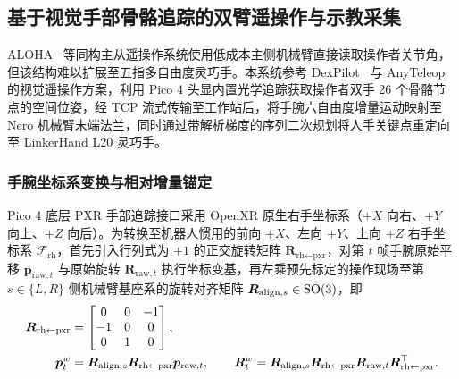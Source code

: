 \subsection{基于视觉手部骨骼追踪的双臂遥操作与示教采集}
\label{subsec:teleop}

ALOHA~\cite{zhao2023learning} 等同构主从遥操作系统使用低成本主侧机械臂直接读取操作者关节角，但该结构难以扩展至五指多自由度灵巧手。本系统参考 DexPilot~\cite{handa2020dexpilot} 与 AnyTeleop~\cite{qin2023anyteleop} 的视觉遥操作方案，利用 Pico 4 头显内置光学追踪获取操作者双手 26 个骨骼节点的空间位姿，经 TCP 流式传输至工作站后，将手腕六自由度增量运动映射至 Nero 机械臂末端法兰，同时通过带解析梯度的序列二次规划将人手关键点重定向至 LinkerHand L20 灵巧手。

\subsubsection{手腕坐标系变换与相对增量锚定}

Pico 4 底层 PXR 手部追踪接口采用 OpenXR 原生右手坐标系（$+X$ 向右、$+Y$ 向上、$+Z$ 向后）。为转换至机器人惯用的前向 $+X$、左向 $+Y$、上向 $+Z$ 右手坐标系 $\mathcal{F}_{\text{rh}}$，首先引入行列式为 $+1$ 的正交旋转矩阵 $\bm{R}_{\text{rh}\leftarrow\text{pxr}}$，对第 $t$ 帧手腕原始平移 $\bm{p}_{\text{raw},t}$ 与原始旋转 $\bm{R}_{\text{raw},t}$ 执行坐标变基，再左乘预先标定的操作现场至第 $s \in \{L, R\}$ 侧机械臂基座系的旋转对齐矩阵 $\bm{R}_{\text{align},s} \in \mathrm{SO}(3)$，即
\begin{align}
  \bm{R}_{\text{rh}\leftarrow\text{pxr}} &= \begin{bmatrix} 0 & 0 & -1 \\ -1 & 0 & 0 \\ 0 & 1 & 0 \end{bmatrix}, \notag\\
  \bm{p}_t^{w} &= \bm{R}_{\text{align},s}\bm{R}_{\text{rh}\leftarrow\text{pxr}}\bm{p}_{\text{raw},t}, \qquad
  \bm{R}_t^{w} = \bm{R}_{\text{align},s}\bm{R}_{\text{rh}\leftarrow\text{pxr}}\bm{R}_{\text{raw},t}\bm{R}_{\text{rh}\leftarrow\text{pxr}}^{\top}.
  \label{eq:pico-wrist-transform}
\end{align}


